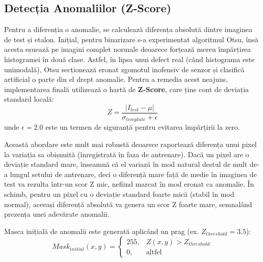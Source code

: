 \documentclass[12pt, a4paper]{article}
\begin{document}
\subsection{Detecția Anomaliilor (Z-Score)}
Pentru a diferenția o anomalie, se calculează diferența absolută dintre imaginea de test și etalon. Inițial, pentru binarizare s-a experimentat algoritmul Otsu, însă acesta eșuează pe imagini complet normale deoarece forțează mereu împărțirea histogramei în două clase. Astfel, în lipsa unui defect real (când histograma este unimodală), Otsu secționează eronat zgomotul inofensiv de senzor și clasifică artificial o parte din el drept anomalie. Pentru a remedia acest neajuns, implementarea finală utilizează o hartă de \textbf{Z-Score}, care ține cont de deviația standard locală:
\begin{equation}
    Z = \frac{|I_{test} - \mu|}{\sigma_{template} + \epsilon}
\end{equation}
unde $\epsilon = 2.0$ este un termen de siguranță pentru evitarea împărțirii la zero. 

Această abordare este mult mai robustă deoarece raportează diferența unui pixel la variația sa obișnuită (înregistrată în faza de antrenare). Dacă un pixel are o deviație standard mare, înseamnă că el variază în mod natural destul de mult de-a lungul setului de antrenare, deci o diferență mare față de medie în imaginea de test va rezulta într-un scor Z mic, nefiind marcat în mod eronat ca anomalie. În schimb, pentru un pixel cu o deviație standard foarte mică (stabil în mod normal), aceeași diferență absolută va genera un scor Z foarte mare, semnalând prezența unei adevărate anomalii.

Masca inițială de anomalii este generată aplicând un prag (ex. $Z_{threshold} = 3.5$):
\begin{equation}
    Mask_{initial}(x, y) = 
    \begin{cases} 
      255, & Z(x, y) > Z_{threshold} \\
      0, & \text{altfel}
    \end{cases}
\end{equation}
\end{document}
